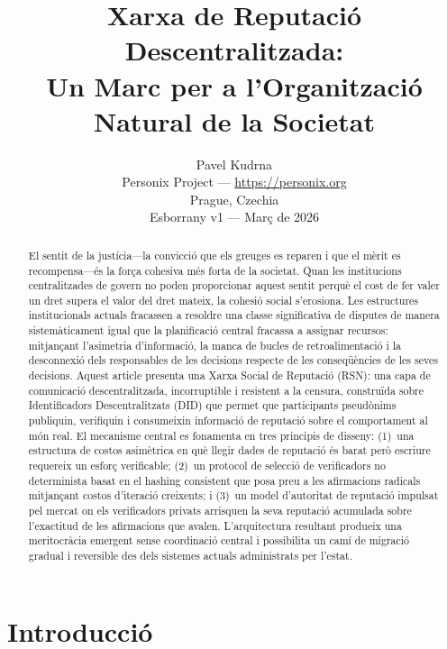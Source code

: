 \documentclass[11pt,a4paper,twocolumn]{article}
\title{\textbf{Xarxa de Reputació Descentralitzada:\\Un Marc per a l'Organització Natural de la Societat}}
\author{Pavel Kudrna\\Personix Project --- \url{https://personix.org}\\Prague, Czechia\\Esborrany v1 --- Març de 2026}
\date{}
\begin{document}
\maketitle

\begin{abstract}
El sentit de la justícia---la convicció que els greuges es reparen i que el mèrit es recompensa---és la força cohesiva més forta de la societat. Quan les institucions centralitzades de govern no poden proporcionar aquest sentit perquè el cost de fer valer un dret supera el valor del dret mateix, la cohesió social s'erosiona. Les estructures institucionals actuals fracassen a resoldre una classe significativa de disputes de manera sistemàticament igual que la planificació central fracassa a assignar recursos: mitjançant l'asimetria d'informació, la manca de bucles de retroalimentació i la desconnexió dels responsables de les decisions respecte de les conseqüències de les seves decisions. Aquest article presenta una Xarxa Social de Reputació (RSN): una capa de comunicació descentralitzada, incorruptible i resistent a la censura, construïda sobre Identificadors Descentralitzats (DID) que permet que participants pseudònims publiquin, verifiquin i consumeixin informació de reputació sobre el comportament al món real. El mecanisme central es fonamenta en tres principis de disseny: (1)~una estructura de costos asimètrica en què llegir dades de reputació és barat però escriure requereix un esforç verificable; (2)~un protocol de selecció de verificadors no determinista basat en el hashing consistent que posa preu a les afirmacions radicals mitjançant costos d'iteració creixents; i (3)~un model d'autoritat de reputació impulsat pel mercat on els verificadors privats arrisquen la seva reputació acumulada sobre l'exactitud de les afirmacions que avalen. L'arquitectura resultant produeix una meritocràcia emergent sense coordinació central i possibilita un camí de migració gradual i reversible des dels sistemes actuals administrats per l'estat.
\end{abstract}

\section{Introducció}
\end{document}
